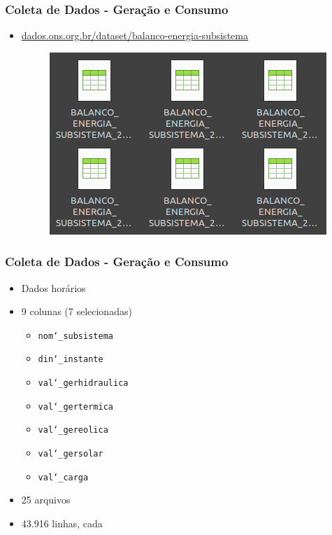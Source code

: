 \documentclass{beamer}
\begin{document}
\begin{frame}
\frametitle{Coleta de Dados - Geração e Consumo}
\begin{itemize}
    \item \href{https://dados.ons.org.br/dataset/balanco-energia-subsistema}{dados.ons.org.br/dataset/balanco-energia-subsistema}
    \begin{figure}
        \centering
        \includegraphics[width=0.6\linewidth]{arquivos-geracao-consumo.png}
    \end{figure}
\end{itemize}
\end{frame}


\begin{frame}
\frametitle{Coleta de Dados - Geração e Consumo}
\begin{itemize}
    \item Dados horários
    \item 9 colunas (7 selecionadas)
    \begin{itemize}
        \item \texttt{nom\char`_subsistema}
        \item \texttt{din\char`_instante}
        \item \texttt{val\char`_gerhidraulica}
        \item \texttt{val\char`_gertermica}
        \item \texttt{val\char`_gereolica}
        \item \texttt{val\char`_gersolar}
        \item \texttt{val\char`_carga}
    \end{itemize}
    \item 25 arquivos
    \item 43.916 linhas, cada
\end{itemize}
\end{frame}
\end{document}
